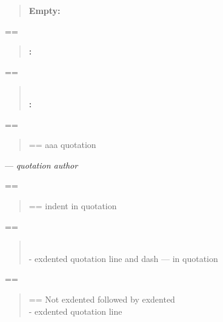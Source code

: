 \documentclass{book}
\makeatletter
\newenvironment{Texinfopreformatted}{%
  \par\GNUTobeylines\obeyspaces\frenchspacing\parskip=\z@\parindent=\z@}{}
{\catcode`\^^M=13 \gdef\GNUTobeylines{\catcode`\^^M=13 \def^^M{\null\par}}}
\newenvironment{Texinfoindented}{\begin{list}{}{}\item\relax}{\end{list}}
\renewcommand{\_}{\Texinfounderscore\discretionary{}{}{}}
\makeatother
\begin{document}
{{\begin{Texinfoindented}
\begin{quote}
\textbf{Empty:} \end{quote}
\begin{Texinfopreformatted}%
\ttfamily 
\end{Texinfopreformatted}
\begin{quote}
\textbf{:} \end{quote}
\begin{Texinfopreformatted}%
\ttfamily 
\end{Texinfopreformatted}
\begin{quote}
\textbf{\leavevmode{}\\:} \end{quote}
\begin{Texinfopreformatted}%
\ttfamily 
\end{Texinfopreformatted}
\begin{quote}
\begin{Texinfopreformatted}%
\ttfamily aaa quotation
\end{Texinfopreformatted}
\end{quote}
\begin{center}
--- \emph{quotation author}
\end{center}
\begin{Texinfopreformatted}%
\ttfamily 
\end{Texinfopreformatted}
\begin{quote}
\begin{Texinfopreformatted}%
\ttfamily indent in quotation
\end{Texinfopreformatted}
\end{quote}
\begin{Texinfopreformatted}%
\ttfamily 
\end{Texinfopreformatted}
\begin{quote}
\leavevmode{}\\
\hbox{\kern -\leftmargin}%
exdented quotation line   and dash --- in quotation
\\
\end{quote}
\begin{Texinfopreformatted}%
\ttfamily 
\end{Texinfopreformatted}
\begin{quote}
\begin{Texinfopreformatted}%
\ttfamily Not exdented followed by exdented
\end{Texinfopreformatted}
\leavevmode{}\\
\hbox{\kern -\leftmargin}%
exdented quotation line
\\
\end{quote}

\end{Texinfoindented}}}
\end{document}
